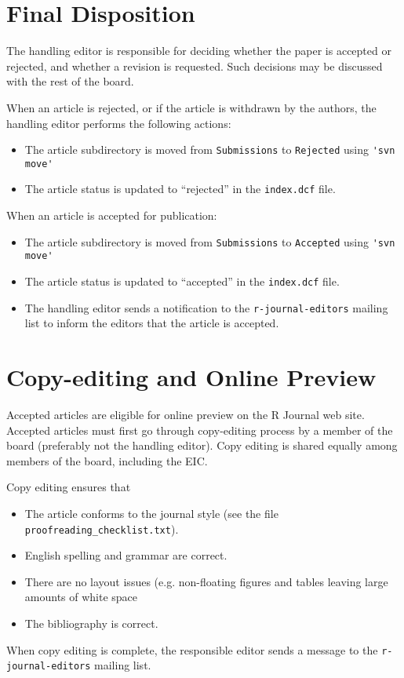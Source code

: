 \documentclass[11pt]{article}
\begin{document}
\section{Final Disposition}

The handling editor is responsible for deciding whether the paper is
accepted or rejected, and whether a revision is requested. Such
decisions may be discussed with the rest of the board.

When an article is rejected, or if the article is withdrawn by the
authors, the handling editor performs the following actions:
\begin{itemize}
\item The article subdirectory is moved from \texttt{Submissions} to
  \texttt{Rejected} using \verb+'svn move'+
\item The article status is updated to ``rejected'' in the \texttt{index.dcf}
  file.
\end{itemize}
When an article is accepted for publication:
\begin{itemize}
\item The article subdirectory is moved from \texttt{Submissions} to
  \texttt{Accepted} using \verb+'svn move'+
\item The article status is updated to ``accepted'' in the \texttt{index.dcf}
  file.
\item The handling editor sends a notification to the \verb+r-journal-editors+
  mailing list to inform the editors that the article is accepted.
\end{itemize}

\section{Copy-editing and Online Preview}

Accepted articles are eligible for online preview on the R Journal web
site.  Accepted articles must first go through copy-editing process by
a member of the board (preferably not the handling editor). Copy
editing is shared equally among members of the board, including the
EIC.

Copy editing ensures that 
\begin{itemize}
\item The article conforms to the journal style (see the file
  \texttt{proofreading\_checklist.txt}).
\item English spelling and grammar are correct.
\item There are no layout issues (e.g. non-floating figures and tables
  leaving large amounts of white space
\item The bibliography is correct.
\end{itemize}
When copy editing is complete, the responsible editor sends a message
to the \verb+r-journal-editors+ mailing list.
\end{document}
